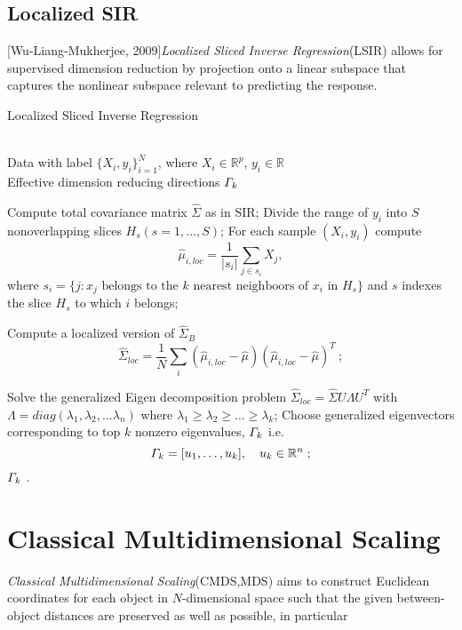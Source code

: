 \documentclass[twoside]{article}
\theoremstyle{definition}
\theoremstyle{definition}
\theoremstyle{remark}
\def\R{{\mathbb R}}
\begin{document}
\subsection{Localized SIR}
[Wu-Liang-Mukherjee, 2009]\emph{Localized Sliced Inverse Regression}(LSIR) allows for supervised dimension reduction by projection onto a linear subspace that captures the nonlinear subspace relevant to predicting the response.

\begin{algorithm}[htb]   
\caption{Localized Sliced Inverse Regression}   
\label{alg:lsir}   
\begin{algorithmic}[1] %
\REQUIRE ~~\\ %
 Data with label $\{X_i,y_i\}_{i=1}^N$, where $X_i\in \mathbb{R}^p$, $y_i\in \mathbb{R}$
\ENSURE ~~\\ %
Effective dimension reducing directions $\mathnormal{\Gamma}_k$

\STATE Compute total covariance matrix $\hat{\Sigma}$ as in SIR; 
\STATE Divide the range of $y_i$ into $S$ nonoverlapping slices $H_s(s = 1,...,S)$;
\STATE For each sample $(X_i,y_i)$ compute 
 $$ \hat{\mu}_{i,loc} = \frac{1}{|s_i|} \sum\limits_{j\in s_i } X_j ,$$
 where $s_i = \{j: x_j \text{ belongs to the $k$ nearest neighboors of $x_i$ in $H_s$}\}$ and $s$ indexes the slice $H_s$ to which $i$ belongs;

\STATE Compute a localized version of $\hat{\Sigma}_B$ 
$$ \hat{\Sigma}_{loc}  = \frac{1}{N} \sum\limits_{i} (\hat{\mu}_{i,loc} - \hat{\mu})(\hat{\mu}_{i,loc} - \hat{\mu})^T \ ;$$
 
\STATE Solve the generalized Eigen decomposition problem 
$\hat{\Sigma}_{loc} = \hat{\Sigma} U\Lambda U^T $ with $\Lambda = diag(\lambda_1,\lambda_2,...\lambda_n)$ where  $\lambda_1 \ge \lambda_2 \ge ... \ge \lambda_k$;
\STATE Choose generalized eigenvectors corresponding to top $k$ nonzero eigenvalues, $\mathnormal{\Gamma}_k$ i.e.
$$\mathnormal{\Gamma}_k=[u_1,\ldots,u_k], \ \ \ u_k\in \R^n \;;$$ 
\RETURN $\mathnormal{\Gamma_k}$ . %
\end{algorithmic}
\end{algorithm}
\section{Classical Multidimensional Scaling}
  \emph{Classical Multidimensional Scaling}(CMDS,MDS) aims to construct Euclidean coordinates for each object in $N$-dimensional space such that the given between-object distances are preserved as well as possible, in particular 
\end{document}
